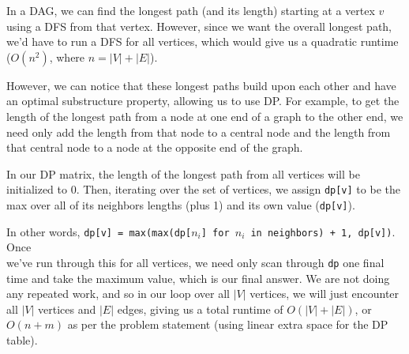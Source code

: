 \documentclass[12pt]{article}
\begin{document}
\begin{enumerate}
        In a DAG, we can find the longest path (and its length) starting at a vertex $v$ using a DFS from that vertex. However, since we 
        want the overall longest path, we'd have to run a DFS for all vertices, which would give us a quadratic runtime 
        ($O(n^2)$, where $n = |V| +  |E|$).

        However, we can notice that these longest paths build upon each other and have an optimal substructure property, 
        allowing us to use DP. For example, to get the length of the longest path from a node at one end of a graph to the other end, 
        we need only add the length from that node to a central node and the length from that central node to a node 
        at the opposite end of the graph.

        In our DP matrix, the length of the longest path from all vertices will be initialized to 0. Then, iterating 
        over the set of vertices, we assign \texttt{dp[v]} to be the max over all of its neighbors lengths (plus 1) and 
        its own value (\texttt{dp[v]}). 
        
        In other words, \texttt{dp[v] = max(max(dp[$n_i$] for $n_i$ in neighbors) + 1, dp[v])}. Once \\
        we've run through this for all vertices, we need only scan through \texttt{dp} one final time and take the 
        maximum value, which is our final answer. We are not doing any repeated work, and so in our loop over all 
        $|V|$ vertices, we will just encounter all $|V|$ vertices and $|E|$ edges, giving us a total runtime of 
        $O(|V| + |E|)$, or $O(n + m)$ as per the problem statement (using linear extra space for the DP table).

    \end{enumerate}
\end{document}
